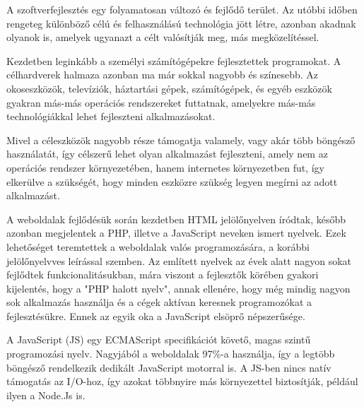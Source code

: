 
A szoftverfejlesztés egy folyamatosan változó és fejlődő terület. Az utóbbi időben rengeteg különböző célú és felhasználású technológia jött létre, azonban akadnak olyanok is, amelyek ugyanazt a célt valósítják meg, más megközelítéssel.

Kezdetben leginkább a személyi számítógépekre fejlesztettek programokat. A célhardverek halmaza azonban ma már sokkal nagyobb és színesebb. Az okoseszközök, televíziók, háztartási gépek, számítógépek, és egyéb eszközök gyakran más-más operációs rendszereket futtatnak, amelyekre más-más technológiákkal lehet fejleszteni alkalmazásokat.

Mivel a céleszközök nagyobb része támogatja valamely, vagy akár több böngésző használatát, így célszerű lehet olyan alkalmazást fejleszteni, amely nem az operációs rendszer környezetében, hanem internetes környezetben fut, így elkerülve a szükségét, hogy minden eszközre szükség legyen megírni az adott alkalmazást.

A weboldalak fejlődésük során kezdetben HTML jelölőnyelven íródtak, később azonban megjelentek a PHP, illetve a JavaScript neveken ismert nyelvek. Ezek  lehetőséget teremtettek a weboldalak valós programozására, a korábbi jelölőnyelvves leírással szemben. Az említett nyelvek az évek alatt nagyon sokat fejlődtek funkcionalitásukban, mára viszont a fejlesztők körében gyakori kijelentés, hogy a "PHP halott nyelv", annak ellenére, hogy még mindig nagyon sok alkalmazás használja és a cégek aktívan keresnek programozókat a fejlesztésükre. Ennek az egyik oka a JavaScript elsöprő népszerűsége.

A  JavaScript (JS) egy ECMAScript specifikációt követő, magas szintű programozási nyelv. Nagyjából a weboldalak 97\%-a használja, így a legtöbb böngésző rendelkezik dedikált JavaScript motorral is. A JS-ben nincs natív támogatás az I/O-hoz, így azokat többnyire más környezettel biztosítják, például ilyen a Node.Js is. \cite{javascript}

